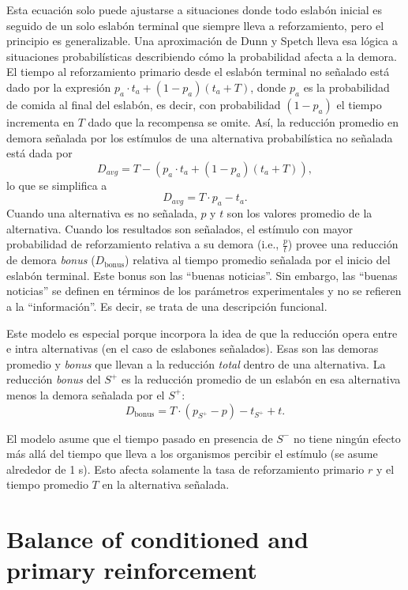 \documentclass[a4paper,12pt]{article}
\begin{document}
Esta ecuación solo puede ajustarse a situaciones donde todo eslabón inicial es seguido de un solo eslabón terminal que siempre lleva a reforzamiento, pero el principio es generalizable.
Una aproximación de Dunn y Spetch lleva esa lógica a situaciones probabilísticas describiendo cómo la probabilidad afecta a la demora.
El tiempo al reforzamiento primario desde el eslabón terminal no señalado está dado por la expresión $p_{a} \cdot t_{a} + (1 - p_{a})(t_{a} + T)$, donde $p_{a}$ es la probabilidad de comida al final del eslabón, es decir, con probabilidad $(1 - p_{a})$ el tiempo incrementa en $T$ dado que la recompensa se omite.
Así, la reducción promedio en demora señalada por los estímulos de una alternativa probabilística no señalada está dada por
\[
    D_{avg} = T - (p_{a} \cdot t_{a} + (1 - p_{a})(t_{a} + T))
,\]
lo que se simplifica a
\[
    D_{avg} = T \cdot p_{a} - t_{a}
.\]
Cuando una alternativa es no señalada, $p$ y $t$ son los valores promedio de la alternativa.
Cuando los resultados son señalados, el estímulo con mayor probabilidad de reforzamiento relativa a su demora (i.e., $\frac{p}{t}$) provee una reducción de demora {\itshape bonus} ($D_{\text{bonus}}$) relativa al tiempo promedio señalada por el inicio del eslabón terminal.
Este bonus son las ``buenas noticias''.
Sin embargo, las ``buenas noticias'' se definen en términos de los parámetros experimentales y no se refieren a la ``información''.
Es decir, se trata de una descripción funcional.

Este modelo es especial porque incorpora la idea de que la reducción opera entre e intra alternativas (en el caso de eslabones señalados).
Esas son las demoras promedio y {\itshape bonus} que llevan a la reducción {\itshape total} dentro de una alternativa.
La reducción {\itshape bonus} del $S^{+}$ es la reducción promedio de un eslabón en esa alternativa menos la demora señalada por el $S^{+}$:
\[
    D_{\text{bonus}} = T \cdot (p_{S^{+}} - p) - t_{S^{+}} + t
.\]

El modelo asume que el tiempo pasado en presencia de $S^{-}$ no tiene ningún efecto más allá del tiempo que lleva a los organismos percibir el estímulo (se asume alrededor de 1 s).
Esto afecta solamente la tasa de reforzamiento primario $r$ y el tiempo promedio $T$ en la alternativa señalada.

\section{Balance of conditioned and primary reinforcement}
\end{document}
